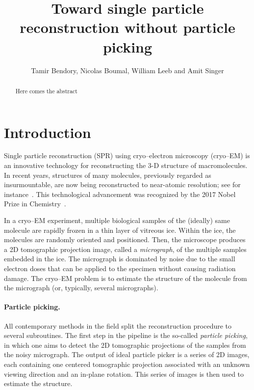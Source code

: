 \documentclass[english,11pt]{article}
\numberwithin{equation}{section}
\theoremstyle{plain}
\theoremstyle{definition}
\theoremstyle{remark}
\theoremstyle{plain}
\theoremstyle{remark}
\theoremstyle{plain}
\theoremstyle{plain}
\begin{document}
\title{Toward single particle reconstruction without particle picking}


\author{Tamir Bendory, Nicolas Boumal, William Leeb and Amit Singer}
\maketitle

\begin{abstract}
	Here comes the abstract
\end{abstract}

\section{Introduction}

Single particle reconstruction (SPR) using cryo--electron microscopy (cryo--EM) is an innovative technology for reconstructing the 3-D structure of macromolecules. In recent years, structures
of many molecules, previously regarded as insurmountable, are now being reconstructed to near-atomic resolution; see for instance~\cite{kuhlbrandt2014resolution,bartesaghi20152,smith2014beyond}. This technological advancement was recognized by the 2017 Nobel Prize in Chemistry~\cite{nobel}. 

In a cryo--EM experiment, multiple biological samples of the (ideally) same molecule are rapidly frozen in a thin layer of vitreous ice. Within the ice, the molecules are randomly oriented and positioned. Then, the microscope produces a 2D tomographic projection image, called a \emph{micrograph}, of the multiple samples embedded in the ice. The micrograph is dominated by noise due to the small electron doses that
can be applied to the specimen without causing radiation damage.
The cryo--EM problem is to estimate the structure of the molecule from the micrograph (or, typically, several micrographs). 

\paragraph{Particle picking.}
All contemporary methods in the field split the reconstruction procedure to several subroutines. 
The first step in the pipeline is the so-called \emph{particle picking}, in which one aims to detect the 2D tomographic projections of the samples from the noisy micrograph. The output of ideal particle picker is a series of 2D images, each containing one centered tomographic projection associated with an unknown viewing direction and an in-plane rotation. This series of images 
is then used to estimate the structure.
\end{document}
